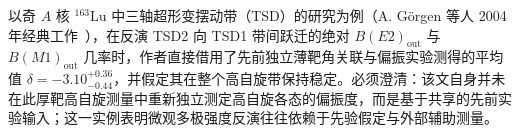 以奇 $A$ 核 $^{163}\mathrm{Lu}$ 中三轴超形变摆动带（TSD）的研究为例（A. Görgen 等人 2004 年经典工作~\cite{campaign-g07-gorgen-2004-163lu-quadrupole-moments}），在反演 TSD2 向 TSD1 带间跃迁的绝对 $B(E2)_{\mathrm{out}}$ 与 $B(M1)_{\mathrm{out}}$ 几率时，作者直接借用了先前独立薄靶角关联与偏振实验测得的平均值 $\delta = -3.10^{+0.36}_{-0.44}$，并假定其在整个高自旋带保持稳定。必须澄清：该文自身并未在此厚靶高自旋测量中重新独立测定高自旋各态的偏振度，而是基于共享的先前实验输入；这一实例表明微观多极强度反演往往依赖于先验假定与外部辅助测量。

